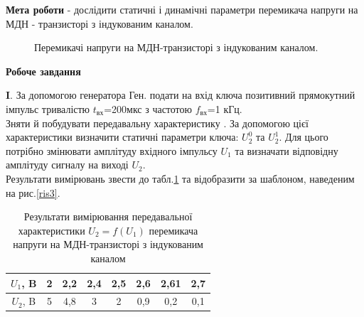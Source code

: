 \documentclass[a4paper,14pt]{extreport}
\begin{document}
\textbf{Мета роботи} - дослідити статичні і динамічні параметри перемикача напруги на МДН - транзисторі з індукованим каналом.

\begin{figure}[h]
	\caption{Перемикачі напруги на МДН-транзисторі з індукованим каналом.}
	\label{ris5}
\end{figure}


\begin{center}
\textbf{Робоче завдання}
\end{center}

\textbf{I}. За допомогою генератора Ген. подати на вхід ключа позитивний прямокутний імпульс тривалістю $t_{\text{вх}}$=200мкс з частотою $f_{\text{вх}}$=1 кГц. \\

Зняти й побудувати передавальну характеристику . За допомогою цієї характеристики визначити статичні параметри ключа:  $U_2^0$ та $U_2^1$. Для цього потрібно змінювати амплітуду вхідного імпульсу $U_1$ та визначати відповідну амплітуду сигналу на виході $U_2$. \\

Результати вимірювань звести до табл.\ref{tab3}  та відобразити за шаблоном, наведеним на рис.\ref{ris3}.

\begin{table}[h!]
	\begin{center}
	\caption{Результати вимірювання передавальної характеристики $U_2 = f(U_1)$ перемикача напруги на МДН-транзисторі з індукованим каналом}
		\begin{tabular}{|c|c|c|c|c|c|c|c|}
			\hline
			$U_1$, B & 2 & 2,2 & 2,4 & 2,5 & 2,6 & 2,61 & 2,7 \\ \hline
			$U_2$, B & 5 & 4,8 & 3 & 2 & 0,9 & 0,2 & 0,1 \\ \hline
		\end{tabular}
	
		
		\label{tab3}

	\end{center}
\end{table}
\end{document}
